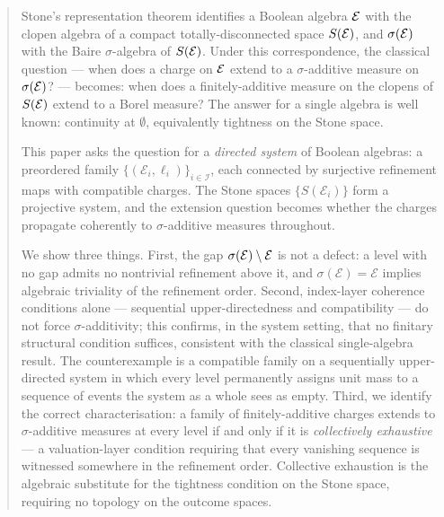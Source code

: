 \maketitle

\begin{abstract}
Stone's representation theorem identifies a Boolean algebra $\E$ with the clopen
algebra of a compact totally-disconnected space $S(\E)$, and $\sigma(\E)$ with the
Baire $\sigma$-algebra of $S(\E)$.  Under this correspondence, the classical question
--- when does a charge on $\E$ extend to a $\sigma$-additive measure on $\sigma(\E)$?
--- becomes: when does a finitely-additive measure on the clopens of $S(\E)$ extend
to a Borel measure?  The answer for a single algebra is well known: continuity at
$\emptyset$, equivalently tightness on the Stone space.

This paper asks the question for a \emph{directed system} of Boolean algebras:
a preordered family $\{(\mathcal{E}_i, \ell_i)\}_{i \in \mathcal{I}}$, each connected
by surjective refinement maps with compatible charges.  The Stone spaces
$\{S(\mathcal{E}_i)\}$ form a projective system, and the extension question becomes
whether the charges propagate coherently to $\sigma$-additive measures throughout.

We show three things.  First, the gap $\sigE \setminus \E$ is not a defect: a level
with no gap admits no nontrivial refinement above it, and $\sigma(\mathcal{E}) = \mathcal{E}$
implies algebraic triviality of the refinement order.  Second, index-layer coherence
conditions alone --- sequential upper-directedness and compatibility --- do not force
$\sigma$-additivity; this confirms, in the system setting, that no finitary structural
condition suffices, consistent with the classical single-algebra result.  The
counterexample is a compatible family on a sequentially upper-directed system in which
every level permanently assigns unit mass to a sequence of events the system as a whole
sees as empty.  Third, we identify the correct characterisation: a family of
finitely-additive charges extends to $\sigma$-additive measures at every level if and
only if it is \emph{collectively exhaustive} --- a valuation-layer condition requiring
that every vanishing sequence is witnessed somewhere in the refinement order.
Collective exhaustion is the algebraic substitute for the tightness condition on the
Stone space, requiring no topology on the outcome spaces.
\end{abstract}

